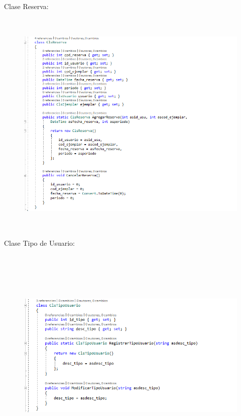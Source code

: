\documentclass[12pt]{article}
\begin{document}
\begin{enumerate}[label*=\arabic*.]
\begin{enumerate}[label*=\arabic*.]
\newpage
Clase Reserva:
\begin{figure}[H]
	\begin{Center}
		\includegraphics[width=4.91in,height=4.35in]{./media/12.png}
	\end{Center}
\end{figure}


Clase Tipo de Usuario:
\begin{figure}[H]
	\begin{Center}
		\includegraphics[width=4.91in,height=4.15in]{./media/13.png}
	\end{Center}
\end{figure}


\end{enumerate}
\end{enumerate}
\end{document}
